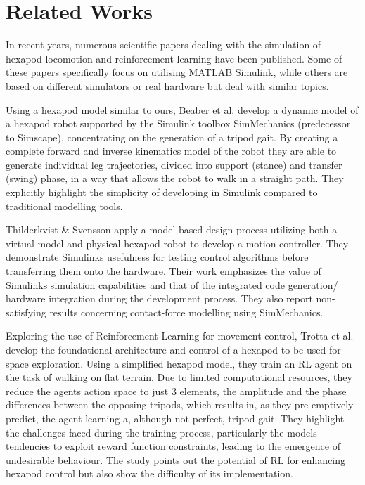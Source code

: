 \chapter{Related Works}
\label{ch:relatedWorks}

In recent years, numerous scientific papers dealing with the simulation of hexapod locomotion and reinforcement learning have been published.
Some of these papers specifically focus on utilising MATLAB Simulink, while others are based on different simulators or real hardware but deal with similar topics.

Using a hexapod model similar to ours, Beaber et al. \parencite{beaber2018dynamic} develop a dynamic model of a hexapod robot supported by the Simulink toolbox SimMechanics (predecessor to Simscape), concentrating on the generation of  a tripod gait.
By creating a complete forward and inverse kinematics model of the robot they are able to generate individual leg trajectories, divided into support (stance) and transfer (swing) phase, in a way that allows the robot to walk in a straight path.
They explicitly highlight the simplicity of developing in Simulink compared to traditional modelling tools.

Thilderkvist \& Svensson \Parencite{thilderkvist2015motion} apply a model-based design process utilizing both a virtual model and physical hexapod robot to develop a motion controller.
They demonstrate Simulinks usefulness for testing control algorithms before transferring them onto the hardware.
Their work emphasizes the value of Simulinks simulation capabilities and that of the integrated code generation/ hardware integration during the development process.
They also report non-satisfying results concerning contact-force modelling using SimMechanics.

Exploring the use of Reinforcement Learning for movement control, Trotta et al. \parencite{trotta2022walking} develop the foundational architecture and control of a hexapod to be used for space exploration.
Using a simplified hexapod model, they train an RL agent on the task of walking on flat terrain.
Due to limited computational resources, they reduce the agents action space to just 3 elements, the amplitude and the phase differences between the opposing tripods, which results in, as they pre-emptively predict, the agent learning a, although not perfect, tripod gait.
They highlight the challenges faced during the training process, particularly the models tendencies to exploit reward function constraints, leading to the emergence of undesirable behaviour.
The study points out the potential of RL for enhancing hexapod control but also show the difficulty of its implementation.
